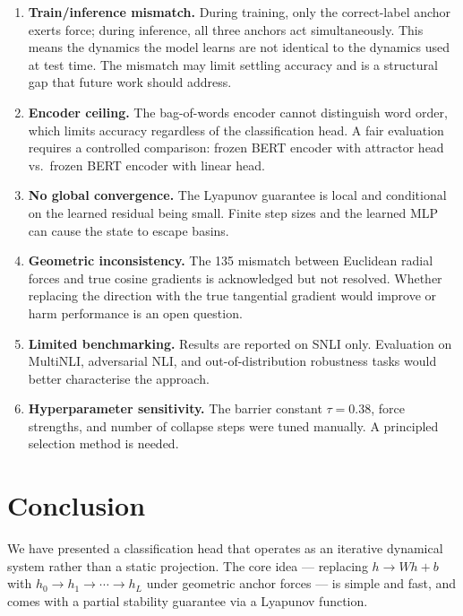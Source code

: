 \documentclass[11pt]{article}
\newcommand{\barrier}{\tau}
\begin{document}
\begin{enumerate}
    \item \textbf{Train/inference mismatch.} During training, only the
          correct-label anchor exerts force; during inference, all three
          anchors act simultaneously. This means the dynamics the model
          learns are not identical to the dynamics used at test time.
          The mismatch may limit settling accuracy and is a structural
          gap that future work should address.
    \item \textbf{Encoder ceiling.} The bag-of-words encoder cannot
          distinguish word order, which limits accuracy regardless of the
          classification head. A fair evaluation requires a controlled
          comparison: frozen BERT encoder with attractor head vs.\ frozen
          BERT encoder with linear head.
    \item \textbf{No global convergence.} The Lyapunov guarantee is local
          and conditional on the learned residual being small. Finite
          step sizes and the learned MLP can cause the state to escape
          basins.
    \item \textbf{Geometric inconsistency.} The 135\textdegree{} mismatch
          between Euclidean radial forces and true cosine gradients is
          acknowledged but not resolved. Whether replacing the direction
          with the true tangential gradient would improve or harm
          performance is an open question.
    \item \textbf{Limited benchmarking.} Results are reported on SNLI
          only. Evaluation on MultiNLI, adversarial NLI, and
          out-of-distribution robustness tasks would better characterise
          the approach.
    \item \textbf{Hyperparameter sensitivity.} The barrier constant
          $\barrier = 0.38$, force strengths, and number of collapse
          steps were tuned manually. A principled selection method
          is needed.
\end{enumerate}

\section{Conclusion}

We have presented a classification head that operates as an iterative
dynamical system rather than a static projection. The core idea ---
replacing $h \to Wh + b$ with $h_0 \to h_1 \to \cdots \to h_L$ under
geometric anchor forces --- is simple and fast, and comes with a partial
stability guarantee via a Lyapunov function.
\end{document}
